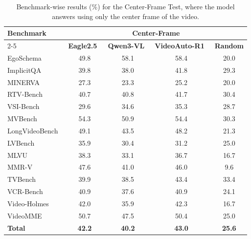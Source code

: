         \begin{table}[h]
        \centering
        \caption{Benchmark-wise results (\%) for the Center-Frame Test, where the model answers using only the center frame of the video.}
        \footnotesize
        \setlength{\tabcolsep}{4pt}
        \begin{tabular}{lcccc}
        \toprule
        \multirow{2}{*}{\textbf{Benchmark}} & \multicolumn{4}{c}{\scriptsize \textbf{Center-Frame}} \\
        \cmidrule(lr){2-5}
         & {\scriptsize \textbf{Eagle2.5~\cite{eagle25}}} & {\scriptsize \textbf{Qwen3-VL}~\cite{qwem3_vl}} & {\scriptsize \textbf{VideoAuto-R1}~\cite{videoautor1}} & {\scriptsize \textbf{Random}} \\
        \midrule
        EgoSchema~\cite{egoschema} & 49.8 & 58.1 & 58.4 & 20.0 \\
        ImplicitQA~\cite{implicitqa} & 39.8 & 38.0 & 41.8 & 29.3 \\
        MINERVA~\cite{minerva} & 27.3 & 23.3 & 25.2 & 20.0 \\
        RTV-Bench~\cite{rtvbench} & 40.7 & 40.8 & 41.7 & 30.4 \\
        VSI-Bench~\cite{vsibench} & 29.6 & 34.6 & 35.3 & 28.7 \\
        MVBench~\cite{mvbench} & 54.3 & 50.9 & 54.4 & 30.3 \\
        LongVideoBench~\cite{longvideobench} & 49.1 & 43.5 & 48.2 & 21.3 \\
        LVBench~\cite{lvbench} & 35.9 & 30.4 & 31.2 & 25.0 \\
        MLVU~\cite{mlvu} & 38.3 & 33.1 & 36.7 & 16.7 \\
        MMR-V~\cite{mmrv} & 47.6 & 41.0 & 46.0 & 9.6 \\
        TVBench~\cite{tvbench} & 39.9 & 38.5 & 43.4 & 33.4 \\
        VCR-Bench~\cite{vcrbench} & 40.9 & 37.6 & 40.9 & 24.1 \\
        Video-Holmes~\cite{videoholmes} & 42.0 & 35.9 & 42.3 & 16.7 \\
        VideoMME~\cite{videomme} & 50.7 & 47.5 & 50.4 & 25.0 \\
        \midrule
        \textbf{Total} & \textbf{42.2} & \textbf{40.2} & \textbf{43.0} & \textbf{25.6} \\
        \bottomrule
        \end{tabular}
        \label{tab:center}
        \end{table}

